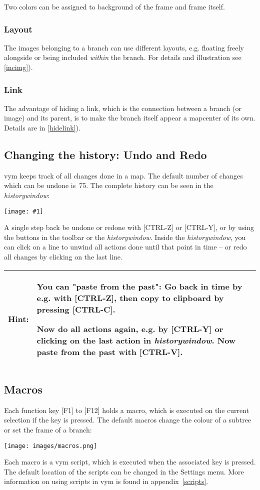 \documentclass[12pt,a4paper]{article}
\newlength{\maximgwidth}
\newcommand{\maximage}[1]{  
    \begin{center}
        \texttt{[image: \#1]} 
    \end{center}
}
\newcommand{\hint}[1]{
    \begin{center} 
        \begin{tabular}{|rp{12cm}|} \hline
            {\bf Hint}:& #1\\   \hline
        \end{tabular}
            \marginpar{\Huge !} 
    \end{center} 
}
\newcommand{\vym}{{\sc vym }}
\newcommand{\key}[1]{[#1]}
\begin{document}
Two colors can be assigned to background of the frame and frame itself.

\subsubsection*{Layout}
The images belonging to a branch can use different layouts, e.g.
floating freely alongside or being included {\em within} the branch. For
details and illustration see \ref{incimg}).

\subsubsection*{Link}
The advantage of hiding a link, which is the connection between a branch
(or image) and its parent, is to make the branch itself appear a
mapcenter of its own. Details are in   \ref{hidelink}).

\subsection{Changing the history: Undo and Redo}
\vym keeps track of all changes done in a map. The default number of
changes which can be undone is~75. The complete history can be seen in
the {\em historywindow}:
    \maximage{images/historywindow.png}
    \label{historywindow}
A single step back be undone or redone with \key{CTRL-Z} or \key{CTRL-Y},
or by using the buttons in the toolbar or the {\em historywindow}.
Inside the {\em historywindow}, you can click on a line to unwind all
actions done until that point in time -- or redo all changes by clicking
on the last line.

\hint{
    You can "paste from the past": Go back in time by e.g. with
    \key{CTRL-Z}, then copy to clipboard by pressing \key{CTRL-C}.

    Now do all actions again, e.g. by \key{CTRL-Y} or clicking on the
    last action in {\em historywindow}. Now paste from the past with
    \key{CTRL-V}.
}

\subsection{Macros} \label{macros}
Each function key
\key{F1} to \key{F12} holds a macro, which is executed on the current
selection if the key is pressed. The default macros change the colour of
a subtree or set the frame of a branch:
\begin{center}
    \texttt{[image: images/macros.png]}
\end{center}
Each macro is a \vym script, which is executed when the associated key
is pressed. The default location of the scripts can be changed in the
Settings menu. More information on using scripts in \vym is found in
appendix~\ref{scripts}.
\end{document}
